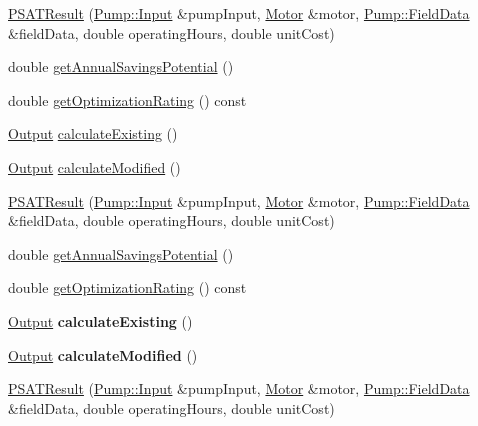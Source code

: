 \begin{DoxyCompactItemize}
\item 
\hyperlink{class_p_s_a_t_result_ad876fe5e1d3da3ad28ccfb6c81f34a98}{P\+S\+A\+T\+Result} (\hyperlink{struct_pump_1_1_input}{Pump\+::\+Input} \&pump\+Input, \hyperlink{struct_motor}{Motor} \&motor, \hyperlink{struct_pump_1_1_field_data}{Pump\+::\+Field\+Data} \&field\+Data, double operating\+Hours, double unit\+Cost)
\item 
double \hyperlink{class_p_s_a_t_result_ab318975db5ccdb0b7786e09a3fdff06b}{get\+Annual\+Savings\+Potential} ()
\item 
double \hyperlink{class_p_s_a_t_result_aa0a7001461408fcb06a6c22ce2d064db}{get\+Optimization\+Rating} () const
\item 
\hyperlink{struct_p_s_a_t_result_1_1_output}{Output} \hyperlink{class_p_s_a_t_result_af0635b72fbe03045d464514a6e91ae46}{calculate\+Existing} ()
\item 
\hyperlink{struct_p_s_a_t_result_1_1_output}{Output} \hyperlink{class_p_s_a_t_result_af36b7142891823698aa04bfae74288e8}{calculate\+Modified} ()
\item 
\hyperlink{class_p_s_a_t_result_ad876fe5e1d3da3ad28ccfb6c81f34a98}{P\+S\+A\+T\+Result} (\hyperlink{struct_pump_1_1_input}{Pump\+::\+Input} \&pump\+Input, \hyperlink{struct_motor}{Motor} \&motor, \hyperlink{struct_pump_1_1_field_data}{Pump\+::\+Field\+Data} \&field\+Data, double operating\+Hours, double unit\+Cost)
\item 
double \hyperlink{class_p_s_a_t_result_ab318975db5ccdb0b7786e09a3fdff06b}{get\+Annual\+Savings\+Potential} ()
\item 
double \hyperlink{class_p_s_a_t_result_aa0a7001461408fcb06a6c22ce2d064db}{get\+Optimization\+Rating} () const
\item 
\mbox{\label{class_p_s_a_t_result_ae0182176bc2f885c6904c79ac6e16055}} 
\hyperlink{struct_p_s_a_t_result_1_1_output}{Output} {\bfseries calculate\+Existing} ()
\item 
\mbox{\label{class_p_s_a_t_result_a89768689e74a09adfa1d4766fce3b30a}} 
\hyperlink{struct_p_s_a_t_result_1_1_output}{Output} {\bfseries calculate\+Modified} ()
\item 
\hyperlink{class_p_s_a_t_result_ad876fe5e1d3da3ad28ccfb6c81f34a98}{P\+S\+A\+T\+Result} (\hyperlink{struct_pump_1_1_input}{Pump\+::\+Input} \&pump\+Input, \hyperlink{struct_motor}{Motor} \&motor, \hyperlink{struct_pump_1_1_field_data}{Pump\+::\+Field\+Data} \&field\+Data, double operating\+Hours, double unit\+Cost)

\end{DoxyCompactItemize}
